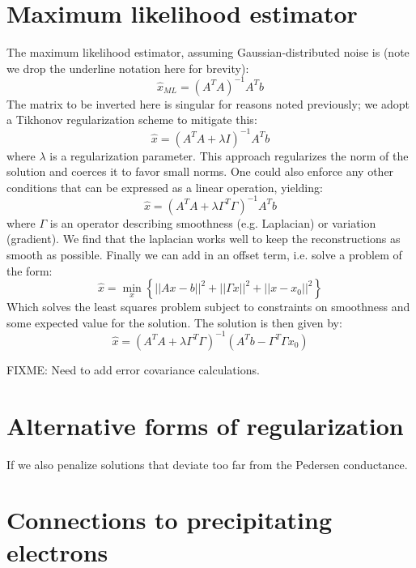 \documentclass[11pt,letterpaper]{article}
\begin{document}
\section{Maximum likelihood estimator}

The maximum likelihood estimator, assuming Gaussian-distributed noise is (note we drop the underline notation here for brevity):
\begin{equation}
\hat{x}_{ML} = \left( A^T A  \right)^{-1} A^T b
\end{equation}
The matrix to be inverted here is singular for reasons noted previously; we adopt a Tikhonov regularization scheme to mitigate this:
\begin{equation}
\hat{x} = \left( A^T A  + \lambda I \right)^{-1} A^T b
\end{equation}
where $\lambda$ is a regularization parameter.  This approach regularizes the norm of the solution and coerces it to favor small norms.  One could also enforce any other conditions that can be expressed as a linear operation, yielding:
\begin{equation}
\hat{x} = \left( A^T A  + \lambda  \Gamma^T \Gamma \right)^{-1} A^T b
\end{equation}
where $\Gamma$ is an operator describing smoothness (e.g. Laplacian) or variation (gradient).  We find that the laplacian works well to keep the reconstructions as smooth as possible.  Finally we can add in an offset term, i.e. solve a problem of the form:
\begin{equation}
\hat{x} = \min_x \left\{  || Ax -b ||^2 + || \Gamma x||^2 +  || x - x_0 ||^2 \right\}
\end{equation}
Which solves the least squares problem subject to constraints on smoothness and some expected value for the solution.  The solution is then given by:
\begin{equation}
\hat{x} = \left( A^T A  + \lambda  \Gamma^T \Gamma \right)^{-1} \left( A^T b - \Gamma^T \Gamma x_0\right)
\end{equation}


FIXME: Need to add error covariance calculations.  


\section{Alternative forms of regularization}

If we also penalize solutions that deviate too far from the Pedersen conductance.  


\section{Connections to precipitating electrons}
\end{document}
